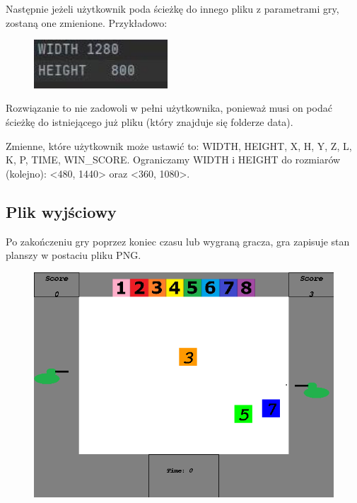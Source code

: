 \documentclass{article}
\begin{document}
Następnie jeżeli użytkownik poda ścieżkę do innego pliku z parametrami gry, zostaną one zmienione. Przykładowo:

\begin{figure} [hbt!]
    \includegraphics[width=5cm,center]{images/plik_przykladowy.JPG}
\end{figure}

Rozwiązanie to nie zadowoli w pełni użytkownika, ponieważ musi on podać ścieżkę do istniejącego już pliku (który znajduje się folderze data).

Zmienne, które użytkownik może ustawić to:
WIDTH, HEIGHT, X, H, Y, Z, L, K, P, TIME, WIN\_SCORE. Ograniczamy WIDTH i HEIGHT do rozmiarów (kolejno): <480, 1440> oraz <360, 1080>.

\clearpage

\subsection{Plik wyjściowy}
Po zakończeniu gry poprzez koniec czasu lub wygraną gracza, gra zapisuje stan planszy w postaciu pliku PNG.
\begin{figure} [hbt!]
    \includegraphics[width=15cm,center]{images/WindowsGameOverScreen.png}
\end{figure}
\end{document}
